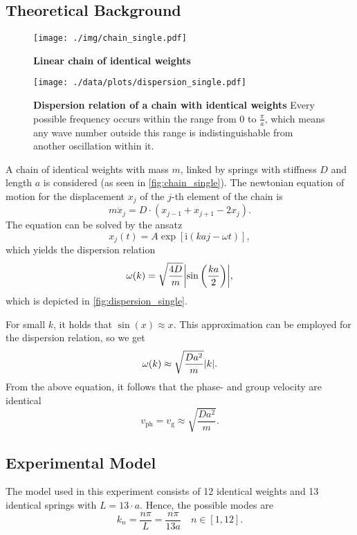 \subsection{Theoretical Background}
\begin{figure}[tbp]
	\centering
	\texttt{[image: ./img/chain\_single.pdf]}
	\caption[Chain of Identical Weights]{\textbf{Linear chain of identical weights}}
	\label{fig:chain_single}
\end{figure}
\begin{figure}[tbp]
	\centering
	\texttt{[image: ./data/plots/dispersion\_single.pdf]}
	\caption[Dispersion Relation of Chain With Identical Weights]{\textbf{Dispersion relation of a chain with identical weights} Every possible frequency occurs within the range from 0 to $\frac{\pi}{a}$, which means any wave number outside this range is indistinguishable from another oscillation within it.}
	\label{fig:dispersion_single}
\end{figure}
A chain of identical weights with mass $m$, linked by springs with stiffness $D$ and length $a$ is considered (as seen in \autoref{fig:chain_single}).
The newtonian equation of motion for the displacement $x_j$ of the $j$-th element of the chain is
\begin{equation*}
	m \ddot x_j = D \cdot \left(x_{j - 1} + x_{j + 1} - 2 x_j \right).
\end{equation*}
The equation can be solved by the ansatz
\begin{equation*}
	x_j(t) = A \exp\left[\text{i} \left(k a j - \omega t\right)\right],
\end{equation*}
which yields the dispersion relation
\begin{equation}
	\omega(k) = \sqrt{\frac{4D}{m}}\abs{\sin\left(\frac{ka}{2}\right)},
\end{equation}
which is depicted in \autoref{fig:dispersion_single}.

For small $k$, it holds that $\sin(x)\approx x$.
This approximation can be employed for the dispersion relation, so we get
\begin{equation*}
	\omega(k)\approx \sqrt{\frac{Da^2}{m}}\abs{k}.
\end{equation*}
From the above equation, it follows that the phase- and group velocity are identical
\begin{equation*}
	v_\text{ph} = v_\text{g}\approx \sqrt{\frac{Da^2}{m}}.
\end{equation*}

\subsection{Experimental Model}\label{subsec:exp_mod_single}
The model used in this experiment consists of 12 identical weights and 13 identical springs with $L=13\cdot a$.
Hence, the possible modes are
\begin{equation*}
	k_n = \frac{n\pi}{L} = \frac{n\pi}{13a}\quad n\in[1, 12].
\end{equation*}

